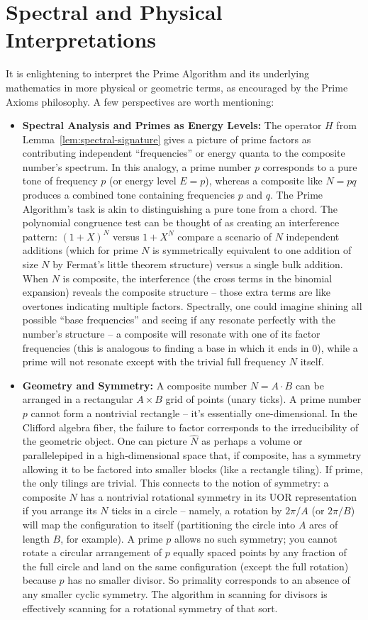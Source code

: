 \documentclass[11pt]{article}
\begin{document}
\section{Spectral and Physical Interpretations}
It is enlightening to interpret the Prime Algorithm and its underlying mathematics in more physical or geometric terms, as encouraged by the Prime Axioms philosophy. A few perspectives are worth mentioning:
\begin{itemize}
    \item \textbf{Spectral Analysis and Primes as Energy Levels:} The operator $H$ from Lemma~\ref{lem:spectral-signature} gives a picture of prime factors as contributing independent “frequencies” or energy quanta to the composite number’s spectrum. In this analogy, a prime number $p$ corresponds to a pure tone of frequency $p$ (or energy level $E=p$), whereas a composite like $N=pq$ produces a combined tone containing frequencies $p$ and $q$. The Prime Algorithm’s task is akin to distinguishing a pure tone from a chord. The polynomial congruence test can be thought of as creating an interference pattern: $(1+X)^N$ versus $1+X^N$ compare a scenario of $N$ independent additions (which for prime $N$ is symmetrically equivalent to one addition of size $N$ by Fermat’s little theorem structure) versus a single bulk addition. When $N$ is composite, the interference (the cross terms in the binomial expansion) reveals the composite structure – those extra terms are like overtones indicating multiple factors. Spectrally, one could imagine shining all possible “base frequencies” and seeing if any resonate perfectly with the number’s structure – a composite will resonate with one of its factor frequencies (this is analogous to finding a base in which it ends in 0), while a prime will not resonate except with the trivial full frequency $N$ itself.
    \item \textbf{Geometry and Symmetry:} A composite number $N = A\cdot B$ can be arranged in a rectangular $A \times B$ grid of points (unary ticks). A prime number $p$ cannot form a nontrivial rectangle – it’s essentially one-dimensional. In the Clifford algebra fiber, the failure to factor corresponds to the irreducibility of the geometric object. One can picture $\hat{N}$ as perhaps a volume or parallelepiped in a high-dimensional space that, if composite, has a symmetry allowing it to be factored into smaller blocks (like a rectangle tiling). If prime, the only tilings are trivial. This connects to the notion of symmetry: a composite $N$ has a nontrivial rotational symmetry in its UOR representation if you arrange its $N$ ticks in a circle – namely, a rotation by $2\pi/A$ (or $2\pi/B$) will map the configuration to itself (partitioning the circle into $A$ arcs of length $B$, for example). A prime $p$ allows no such symmetry; you cannot rotate a circular arrangement of $p$ equally spaced points by any fraction of the full circle and land on the same configuration (except the full rotation) because $p$ has no smaller divisor. So primality corresponds to an absence of any smaller cyclic symmetry. The algorithm in scanning for divisors is effectively scanning for a rotational symmetry of that sort.

\end{itemize}
\end{document}
